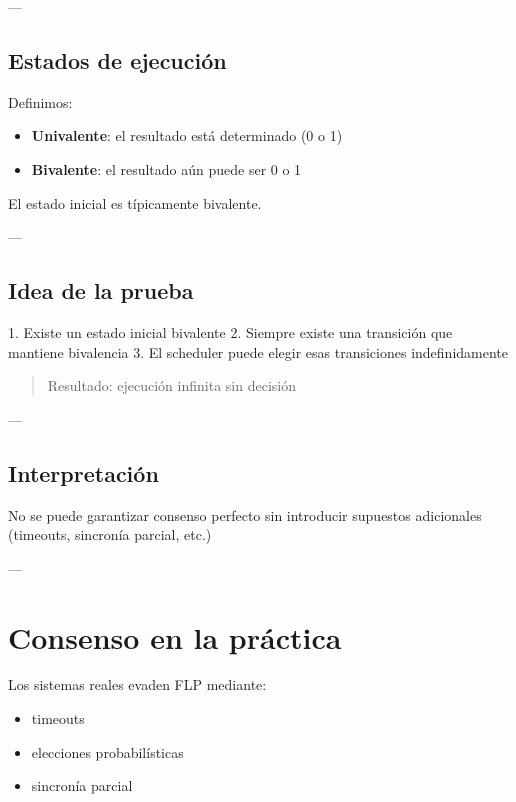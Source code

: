 \documentclass[variant=apuntes,cover=institutional,mode=screen]{ua-engineering-v6-article}
\begin{document}
---

\subsection{Estados de ejecución}

Definimos:

\begin{itemize}
\item \textbf{Univalente}: el resultado está determinado (0 o 1)
\item \textbf{Bivalente}: el resultado aún puede ser 0 o 1
\end{itemize}

El estado inicial es típicamente bivalente.

---

\subsection{Idea de la prueba}

1. Existe un estado inicial bivalente  
2. Siempre existe una transición que mantiene bivalencia  
3. El scheduler puede elegir esas transiciones indefinidamente  

\begin{quote}
Resultado: ejecución infinita sin decisión
\end{quote}

---

\subsection{Interpretación}

\begin{uakeybox}
No se puede garantizar consenso perfecto sin introducir supuestos adicionales (timeouts, sincronía parcial, etc.)
\end{uakeybox}

---

\section{Consenso en la práctica}

Los sistemas reales evaden FLP mediante:

\begin{itemize}
\item timeouts
\item elecciones probabilísticas
\item sincronía parcial
\end{itemize}
\end{document}
